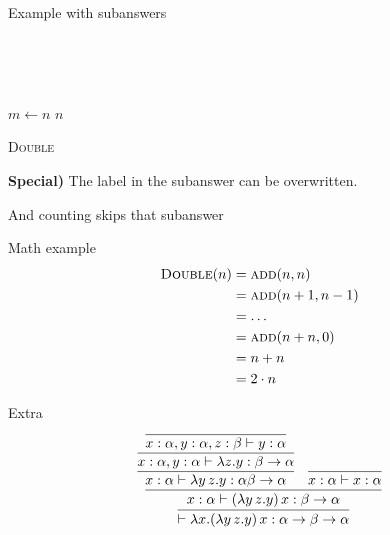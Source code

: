 \documentclass{exsheetans}  %
\begin{document}
\begin{subanswers}[7.5]{Example with subanswers}
    \item~\\
        \begin{center}
    \end{center}
    \item~\\
        \begin{minipage}{\linewidth}%
            \begin{algorithm}[H]
                $m \leftarrow n$\;
                \Return $n$\;
                \caption{\textsc{Double}}
            \end{algorithm}
        \end{minipage}
    \item[\textbf{Special)}] The label in the subanswer can be overwritten.
    \item And counting skips that subanswer
\end{subanswers}
\begin{answer}[4]{Math example}
    \begin{align*}
         \textsc{Double}(n) &= \textsc{add}(n,n)\\
                            &= \textsc{add}(n + 1, n-1)\\
                            &= \ldots\\
                            &= \textsc{add}(n + n, 0)\\
                            &= n + n\\
                            &= 2\cdot n
    \end{align*}
\end{answer}
\begin{supplement}[10]{Extra}
    \[\infer{\vdash \lambda x.(\lambda y\,z.y)\,x:\alpha\to\beta\to\alpha}{
            \infer{x:\alpha\vdash(\lambda y\,z.y)\,x:\beta\to\alpha}{
                  \infer{x:\alpha\vdash\lambda y\,z.y:\alpha\beta\to\alpha}{
                      \infer{x:\alpha,y:\alpha\vdash\lambda z.y:\beta\to\alpha}{
                          \infer{x:\alpha,y:\alpha,z:\beta\vdash y:\alpha}{}
                      }
                  }
                & \infer{x:\alpha\vdash x:\alpha}{}
            }
    }\]
\end{supplement}
\end{document}
